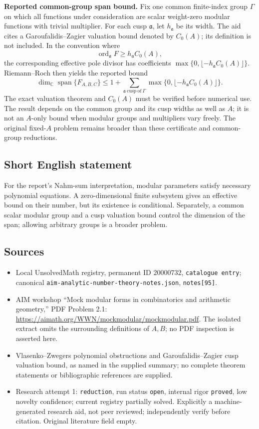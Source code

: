 \documentclass[11pt]{article}
\newcommand{\C}{\mathbb{C}}
\begin{document}
\textbf{Reported common-group span bound.} Fix one common finite-index group $\Gamma$ on which all functions under consideration are scalar weight-zero modular functions with trivial multiplier. For each cusp $\mathfrak a$, let $h_{\mathfrak a}$ be its width. The aid cites a Garoufalidis--Zagier valuation bound denoted by $C_0(A)$; its definition is not included. In the convention where
\[
 \operatorname{ord}_{\mathfrak a}F\geq h_{\mathfrak a}C_0(A),
\]
the corresponding effective pole divisor has coefficients $\max\{0,\lfloor-h_{\mathfrak a}C_0(A)\rfloor\}$. Riemann--Roch then yields the reported bound
\[
 \dim_\C\operatorname{span}\{F_{A,B,C}\}
 \leq1+\sum_{\mathfrak a\ \mathrm{cusp\ of}\ \Gamma}
 \max\{0,\lfloor-h_{\mathfrak a}C_0(A)\rfloor\}.
\]
The exact valuation theorem and $C_0(A)$ must be verified before numerical use. The result depends on the common group and its cusp widths as well as $A$; it is not an $A$-only bound when modular groups and multipliers vary freely. The original fixed-$A$ problem remains broader than these certificate and common-group reductions.
\subsection{Short English statement}
For the report's Nahm-sum interpretation, modular parameters satisfy necessary polynomial equations. A zero-dimensional finite subsystem gives an effective bound on their number, but its existence is conditional. Separately, a common scalar modular group and a cusp valuation bound control the dimension of the span; allowing arbitrary groups is a broader problem.
\subsection{Sources}
\begin{itemize}
\item Local UnsolvedMath registry, permanent ID $20000732$, \texttt{catalogue entry}; canonical \texttt{aim-analytic-number-theory-notes.json}, \texttt{notes[95]}.
\item AIM workshop ``Mock modular forms in combinatorics and arithmetic geometry,'' PDF Problem 2.1: \url{https://aimath.org/WWN/mockmodular/mockmodular.pdf}. The isolated extract omits the surrounding definitions of $A,B$; no PDF inspection is asserted here.
\item Vlasenko--Zwegers polynomial obstructions and Garoufalidis--Zagier cusp valuation bound, as named in the supplied summary; no complete theorem statements or bibliographic references are supplied.
\item Research attempt 1: \texttt{reduction}, run status \texttt{open}, internal rigor \texttt{proved}, low novelty confidence; current registry partially solved. Explicitly a machine-generated research aid, not peer reviewed; independently verify before citation. Original literature field empty.
\end{itemize}
\end{document}
